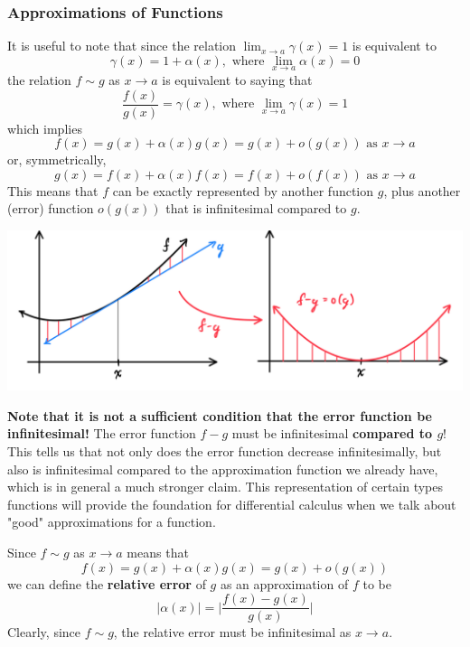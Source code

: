 \documentclass{article}
\begin{document}
    \subsubsection{Approximations of Functions}
    It is useful to note that since the relation $\lim_{x \rightarrow a} \gamma(x) = 1$ is equivalent to 
    \[\gamma (x) = 1 + \alpha(x), \text{ where } \lim_{x \rightarrow a} \alpha(x) = 0\]
    the relation $f \sim g$ as $x\rightarrow a$ is equivalent to saying that
    \[\frac{f(x)}{g(x)} = \gamma(x), \text{ where } \lim_{x \rightarrow a} \gamma(x) = 1\]
    which implies 
    \[f(x) = g(x) + \alpha(x) g(x) = g(x) + o(g(x)) \text{ as } x \rightarrow a\]
    or, symmetrically, 
    \[g(x) = f(x) + \alpha(x) f(x) = f(x) + o(f(x)) \text{ as } x \rightarrow a\]
    This means that $f$ can be exactly represented by another function $g$, plus another (error) function $o(g(x))$ that is infinitesimal compared to $g$. 
    \begin{center}
        \includegraphics[scale=0.28]{img/Error_Approximation_of_Function.PNG}
    \end{center}
    \textbf{Note that it is not a sufficient condition that the error function be infinitesimal!} The error function $f-g$ must be infinitesimal \textbf{compared to $g$}! This tells us that not only does the error function decrease infinitesimally, but also is infinitesimal compared to the approximation function we already have, which is in general a much stronger claim. This representation of certain types functions will provide the foundation for differential calculus when we talk about "good" approximations for a function. 


    \begin{definition}
      Since $f \sim g$ as $x \rightarrow a$ means that 
      \[f(x) = g(x) + \alpha(x) g(x) = g(x) + o(g(x))\]
      we can define the \textbf{relative error} of $g$ as an approximation of $f$ to be
      \[|\alpha(x)| = \bigg| \frac{f(x) - g(x)}{g(x)} \bigg|\]
      Clearly, since $f \sim g$, the relative error must be infinitesimal as $x \rightarrow a$. 
    \end{definition}
\end{document}
